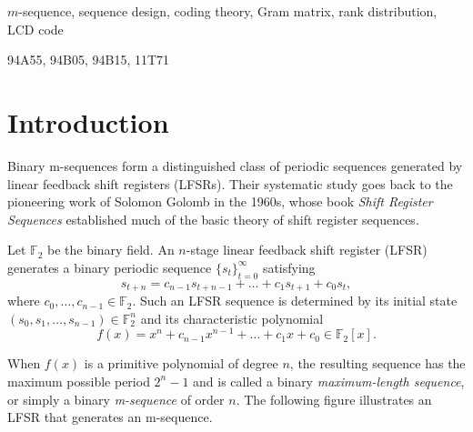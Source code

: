 \documentclass[hidelinks,onefignum,onetabnum]{siamart251216}
\theoremstyle{definition}
\theoremstyle{remark}
\begin{document}
	\begin{keywords}
		$m$-sequence, sequence design, coding theory, Gram matrix, rank distribution, LCD code
	\end{keywords}
	
	\begin{MSCcodes}
		94A55, 94B05, 94B15, 11T71
	\end{MSCcodes}



\section{Introduction}


Binary m-sequences form a distinguished class of periodic sequences generated by linear feedback shift registers (LFSRs). Their systematic study goes back to the pioneering work of Solomon Golomb in the 1960s, whose book \textit{Shift Register Sequences} \cite{Golomb 1967} established much of the basic theory of shift register sequences.


Let $\mathbb{F}_2$ be the binary field. An $n$-stage linear feedback shift register (LFSR) generates a binary periodic sequence $\{s_t\}_{t=0}^{\infty}$ satisfying
\begin{equation}
	s_{t+n}=c_{n-1}s_{t+n-1}+\dots+c_1s_{t+1}+c_0s_t,
\end{equation}
where $c_0,\dots,c_{n-1}\in \mathbb{F}_2$. Such an LFSR sequence is determined by its initial state $(s_0,s_1,\dots,s_{n-1})\in \mathbb{F}_2^n$ and its characteristic polynomial
\[
f(x)=x^n+c_{n-1}x^{n-1}+\dots+c_1x+c_0\in\mathbb{F}_2[x].
\]

When $f(x)$ is a primitive polynomial of degree $n$, the resulting sequence has the maximum possible period $2^n-1$ and is called a binary \textit{maximum-length sequence}, or simply a binary \textit{m-sequence} of order $n$. The following figure illustrates an LFSR that generates an m-sequence. %
\end{document}
